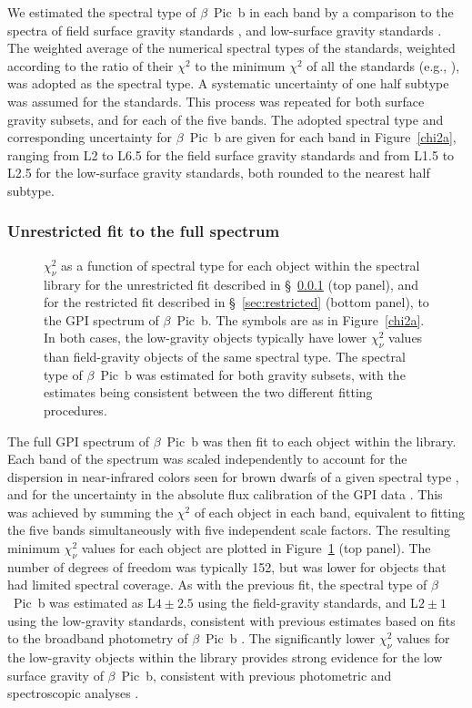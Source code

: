 \documentclass[twocolumn]{aastex6}
\begin{document}
We estimated the spectral type of $\beta$~Pic~b in each band by a comparison to the spectra of field surface gravity standards \citep{Burgasser:2006cf,Kirkpatrick:2010dc}, and low-surface gravity standards \citep{Allers2013}. The weighted average of the numerical spectral types of the standards, weighted according to the ratio of their $\chi^2$ to the minimum $\chi^2$ of all the standards (e.g., \citealp{2010ApJ...710.1142B}), was adopted as the spectral type. A systematic uncertainty of one half subtype was assumed for the standards. This process was repeated for both surface gravity subsets, and for each of the five bands. The adopted spectral type and corresponding uncertainty for $\beta$~Pic~b are given for each band in Figure~\ref{chi2a}, ranging from L2 to L6.5 for the field surface gravity standards and from L1.5 to L2.5 for the low-surface gravity standards, both rounded to the nearest half subtype.

\subsubsection{Unrestricted fit to the full spectrum}
\label{sec:unrestricted}
\begin{figure}
\caption{$\chi^2_{\nu}$ as a function of spectral type for each object within the spectral library for the unrestricted fit described in \S~\ref{sec:unrestricted} (top panel), and for the restricted fit described in \S~\ref{sec:restricted} (bottom panel), to the GPI spectrum of $\beta$~Pic~b. The symbols are as in Figure~\ref{chi2a}. In both cases, the low-gravity objects typically have lower $\chi^2_{\nu}$ values than field-gravity objects of the same spectral type. The spectral type of $\beta$~Pic~b was estimated for both gravity subsets, with the estimates being consistent between the two different fitting procedures.}
\label{chi2b}
\end{figure}
The full GPI spectrum of $\beta$~Pic~b was then fit to each object within the library. Each band of the spectrum was scaled independently to account for the dispersion in near-infrared colors seen for brown dwarfs of a given spectral type \citep{Leggett2003}, and for the uncertainty in the absolute flux calibration of the GPI data \citep{2014SPIE.9147E..85M}. This was achieved by summing the $\chi^2$ of each object in each band, equivalent to fitting the five bands simultaneously with five independent scale factors. The resulting minimum $\chi^2_{\nu}$ values for each object are plotted in Figure~\ref{chi2b} (top panel). The number of degrees of freedom was typically 152, but was lower for objects that had limited spectral coverage. As with the previous fit, the spectral type of $\beta$~Pic~b was estimated as L$4\pm 2.5$ using the field-gravity standards, and L$2\pm 1$ using the low-gravity standards, consistent with previous estimates based on fits to the broadband photometry of $\beta$~Pic~b \citep{Males2014}. The significantly lower $\chi^2_{\nu}$ values for the low-gravity objects within the library provides strong evidence for the low surface gravity of $\beta$~Pic~b, consistent with previous photometric and spectroscopic analyses \citep{Chilcote2015,Morzinski2015}.
\end{document}
